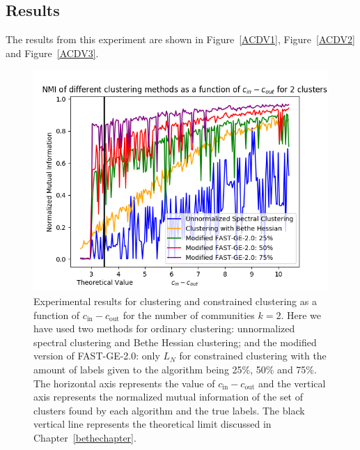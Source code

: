 \subsection*{Results}
The results from this experiment are shown in Figure~\vref{ACDV1}, Figure~\vref{ACDV2} and Figure~\vref{ACDV3}.

\begin{figure}[]
\begin{center}
\includegraphics[width=14.5cm]{figures/ACDV1.png}
\end{center}
   \caption[Experimental results for clustering and constrained clustering as a function of $c_\text{in} - c_\text{out}$ for the number of communities $k=2$]{Experimental results for clustering and constrained clustering as a function of $c_\text{in} - c_\text{out}$ for the number of communities $k=2$. Here we have used two methods for ordinary clustering: unnormalized spectral clustering and Bethe Hessian clustering; and the modified version of FAST-GE-2.0: only $L_N$ for constrained clustering with the amount of labels given to the algorithm being 25\%, 50\% and 75\%. The horizontal axis represents the value of $c_\text{in} - c_\text{out}$ and the vertical axis represents the normalized mutual information of the set of clusters found by each algorithm and the true labels. The black vertical line represents the theoretical limit discussed in Chapter~\ref{bethechapter}.}
\label{ACDV1}
\end{figure}

